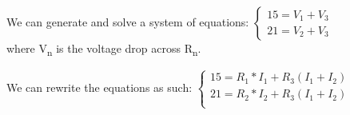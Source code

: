 \documentclass[12pt,letterpaper]{article}
\begin{document}
We can generate and solve a system of equations:
$\begin{cases}
15 = V_{1} + V_{3} \\
21 = V_{2} + V_{3} 
\end{cases}$ \\

where V\textsubscript{n} is the voltage drop across R\textsubscript{n}. 

We can rewrite the equations as such:
$\begin{cases}
15 = R_{1}*I_{1} + R_{3}(I_{1}+I_{2}) \\
21 = R_{2}*I_{2} + R_{3}(I_{1}+I_{2})\\
\end{cases}$
\end{document}
